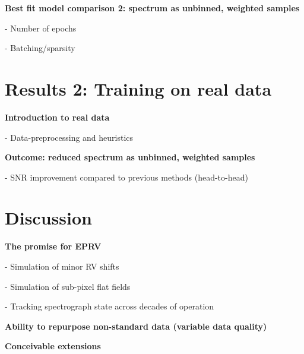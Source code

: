 \documentclass[twocolumn]{aastex63}
\begin{document}
\begin{mdframed}
  \textbf{Best fit model comparison 2: spectrum as unbinned, weighted samples} \par
  - Number of epochs\par
  - Batching/sparsity\par
  \textcolor{lightgray}{\lipsum[11]}
\end{mdframed}


\section{Results 2: Training on real data}
\begin{mdframed}
  \textbf{Introduction to real data} \par
  - Data-preprocessing and heuristics \par
  \textcolor{lightgray}{\lipsum[12]}
\end{mdframed}

\begin{mdframed}
  \textbf{Outcome: reduced spectrum as unbinned, weighted samples} \par
  - SNR improvement compared to previous methods (head-to-head)\par
  \textcolor{lightgray}{\lipsum[13]}
\end{mdframed}

\pagebreak
\clearpage

\section{Discussion}
\begin{mdframed}
  \textbf{The promise for EPRV} \par
  - Simulation of minor RV shifts\par
  - Simulation of sub-pixel flat fields \par
  - Tracking spectrograph state across decades of operation\par
  \textcolor{lightgray}{\lipsum[14]}
\end{mdframed}


\begin{mdframed}
  \textbf{Ability to repurpose non-standard data (variable data quality)} \par
  \textcolor{lightgray}{\lipsum[15]}
\end{mdframed}


\begin{mdframed}
  \textbf{Conceivable extensions} \par
  \textcolor{lightgray}{\lipsum[16]}
\end{mdframed}



\acknowledgements






\clearpage



\end{document}
